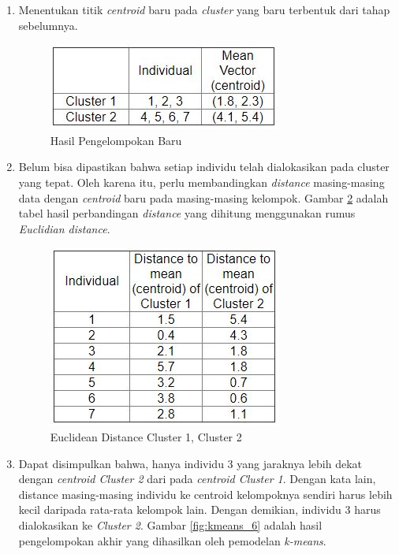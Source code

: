 \documentclass[a4paper,twoside]{article}
\begin{document}
\begin{enumerate}
\begin{enumerate}
\item Menentukan titik \textit{centroid} baru pada \textit{cluster} yang baru terbentuk dari tahap sebelumnya.

\begin{figure}[H]
	\centering
	\includegraphics[scale=0.9]{kmeans_4}
	\caption{Hasil Pengelompokan Baru}
	\label{fig:kmeans_4}
\end{figure}

\item Belum bisa dipastikan bahwa setiap individu telah dialokasikan pada cluster yang tepat. Oleh karena itu, perlu membandingkan \textit{distance} masing-masing data dengan \textit{centroid} baru pada masing-masing kelompok. Gambar \ref{fig:kmeans_5} adalah tabel hasil perbandingan \textit{distance} yang dihitung menggunakan rumus \textit{Euclidian distance}.

\begin{figure}[H]
	\centering
	\includegraphics[scale=0.9]{kmeans_5}
	\caption{Euclidean Distance Cluster 1, Cluster 2}
	\label{fig:kmeans_5}
\end{figure}

\item Dapat disimpulkan bahwa, hanya individu 3 yang jaraknya lebih dekat dengan \textit{centroid Cluster 2} dari pada \textit{centroid Cluster 1}. Dengan kata lain, distance masing-masing individu ke centroid kelompoknya sendiri harus lebih kecil daripada rata-rata kelompok lain. Dengan demikian, individu 3 harus dialokasikan ke \textit{Cluster 2}. Gambar \ref{fig:kmeans_6} adalah hasil pengelompokan akhir yang dihasilkan oleh pemodelan \textit{k-means}.


\end{enumerate}
\end{enumerate}
\end{document}
